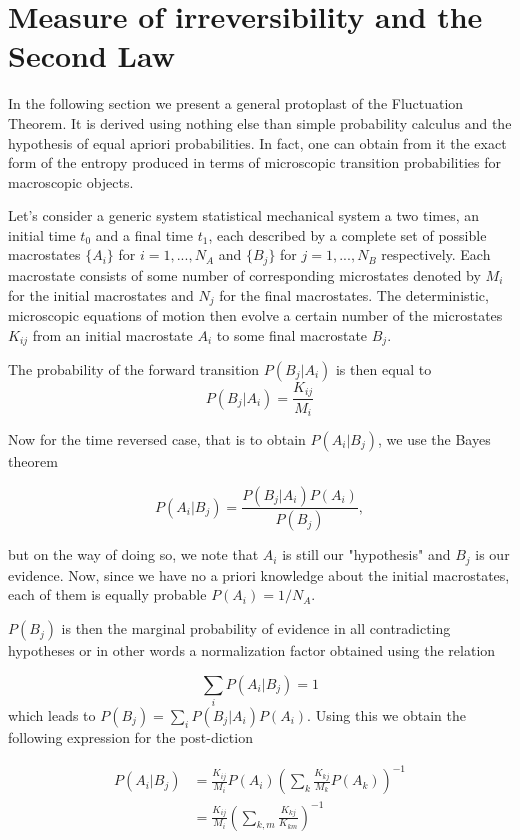 \documentclass[a4paper,12pt]{article}
\begin{document}
\section{Measure of irreversibility and the Second Law}
\label{IrreversibilityMeasure}
In the following section we present a general protoplast of the Fluctuation Theorem. It is derived using nothing else than simple probability calculus and the hypothesis of equal apriori probabilities.
In fact, one can obtain from it the exact form of the entropy produced in terms of microscopic transition probabilities for macroscopic objects.

Let's consider a generic system statistical mechanical system a two times, an initial time $t_0$ and a final time $t_1$, each described by a complete set of possible macrostates $\{A_i\}$ for $ i=1,...,N_A $ and $\{B_j\}$ for $ j=1,...,N_B $  respectively. Each macrostate consists of some number of corresponding microstates denoted by $M_i$ for the initial macrostates and $N_j$ for the final macrostates. The deterministic, microscopic equations of motion then evolve a certain number of the microstates $K_{ij}$ from an initial macrostate $A_i$ to some final macrostate $B_j$.

The probability of the forward transition $P(B_j|A_i)$ is then equal to
\begin{equation}
  P(B_j|A_i)= \frac{K_{ij}}{M_i}
\end{equation}

Now for the time reversed case, that is to obtain $P(A_i|B_j)$, we use the Bayes theorem

\begin{equation}
  P(A_i|B_j)=\frac{P(B_j|A_i)P(A_i)}{P(B_j)},
\end{equation}

but on the way of doing so, we note that $A_i$ is still our "hypothesis" and $B_j$ is our evidence. Now, since we have no a priori knowledge about the initial macrostates, each of them is equally probable $P(A_i)= 1/N_A$.

$P(B_j)$ is then the marginal probability of evidence in all contradicting hypotheses or in other words a normalization factor obtained using the relation 

\begin{equation}
  \sum_i P(A_i|B_j) = 1
\end{equation}
which leads to $P(B_j) = \sum_i P(B_j|A_i)P(A_i)$. Using this we obtain the following expression for the post-diction

\begin{equation}
\begin{aligned}
  P(A_i|B_j) &= \frac{K_{ij}}{M_i} P(A_i) \left( \sum_k \frac{K_{kj}}{M_k}P(A_k) \right)^{-1}\\
  &= \frac{K_{ij}}{M_i} \left( \sum_{k,m} \frac{K_{kj}}{K_{km}} \right)^{-1}
\end{aligned}
\end{equation}
\end{document}
